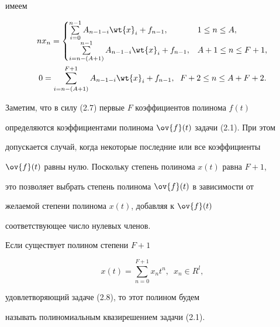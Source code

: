 имеем


\begin{gather}


nx_{n}=


\begin{cases}


\sum\limits_{i=0}^{n-1}A_{n-1-i}\wt{x}_{i}+f_{n-1}, &1\leq n\leq A,\\


%


\sum\limits_{i=n-(A+1)}^{n-1}A_{n-1-i}\wt{x}_{i}+f_{n-1},


& A+1\leq n\leq F+1,


\end{cases}


\\


0=\sum_{i=n-(A+1)}^{F+1}A_{n-1-i}\wt{x}_{i}+f_{n-1},\ \;


F+2\leq n\leq A+F+2.


\end{gather}





Заметим, что в силу (2.7) первые $F$ коэффициентов полинома $f(t)$


определяются коэффициентами полинома $\ov {f}(t)$ задачи (2.1).  При этом


допускается случай, когда некоторые последние или все коэффициенты


$\ov{f}(t)$ равны нулю. Поскольку степень полинома $x(t)$ равна $F+1$,


это позволяет выбрать степень полинома $\ov {f}(t)$ в зависимости от


желаемой степени полинома $x(t)$, добавляя к  $\ov {f}(t)$


соответствующее число нулевых членов.





\begin{defns}


Если существует полином степени $F+1$


\begin{equation}


x(t)=\sum_{n=0}^{F+1}x_{n}t^{n},\ \;x_{n}\in R^{l},


\end{equation}


удовлетворяющий задаче (2.8), то этот полином будем


называть полиномиальным квазирешением задачи (2.1).


\end{defns}





